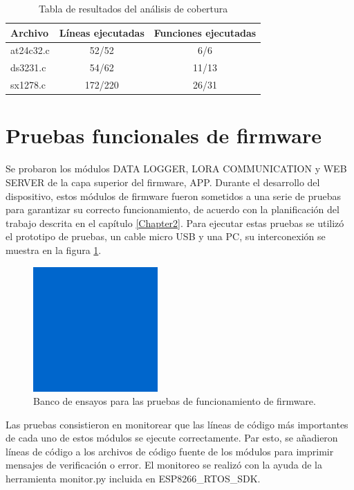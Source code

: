 \begin{table}[h]
	\centering
	\caption[Análisis de cobertura]{Tabla de resultados del análisis de cobertura}
	\begin{tabular}{l c c}    
		\toprule
		\textbf{Archivo} & \textbf{Líneas ejecutadas} & \textbf{Funciones ejecutadas}  \\
		\midrule
		at24c32.c & 52/52 & 6/6 \\		
		ds3231.c & 54/62 & 11/13 \\
		sx1278.c & 172/220 & 26/31 \\
		\bottomrule
		\hline
	\end{tabular}
	\label{tab:coverAnalysis}
\end{table}


\section{Pruebas funcionales de firmware}
\label{sec:pruebasFW}

Se probaron los módulos DATA LOGGER, LORA COMMUNICATION y WEB SERVER de la capa superior del firmware, APP. Durante el desarrollo del dispositivo, estos módulos de firmware fueron sometidos a una serie de pruebas para garantizar su correcto funcionamiento, de acuerdo con la planificación del trabajo descrita en el capítulo \ref{Chapter2}. Para ejecutar estas pruebas se utilizó el prototipo de pruebas, un cable micro USB y una PC, su interconexión se muestra en la figura \ref{fig:tbFW}.

\begin{figure}[ht]
	\centering
	\includegraphics[scale=1.2]{./Figures/cuadradoAzul.png}
	\caption{Banco de ensayos para las pruebas de funcionamiento de firmware.}
	\label{fig:tbFW}
\end{figure}

Las pruebas consistieron en monitorear que las líneas de código más importantes de cada uno de estos módulos se ejecute correctamente. Par esto, se añadieron líneas de código a los archivos de código fuente de los módulos para imprimir mensajes de verificación o error. El monitoreo se realizó con la ayuda de la herramienta monitor.py incluida en ESP8266\_RTOS\_SDK.


